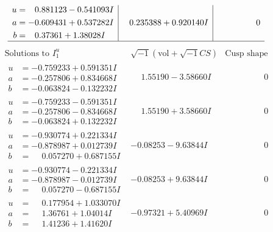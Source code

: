 \documentclass[1p]{elsarticle_modified}
\theoremstyle{definition}
\newcommand{\I}{\sqrt{-1}}
\begin{document}
$$\begin{array}{c|c|c}
\begin{aligned}
u &= \phantom{-}0.881123 - 0.541093 I \\
a &= -0.609431 + 0.537282 I \\
b &= \phantom{-}0.37361 + 1.38028 I\end{aligned}
 & \phantom{-}0.235388 + 0.920140 I & \phantom{-0.000000 } 0\\
 \hline 
 \end{array}$$\newpage$$\begin{array}{c|c|c}  
\text{Solutions to }I^u_{1}& \I (\text{vol} + \sqrt{-1}CS) & \text{Cusp shape}\\
 \hline 
\begin{aligned}
u &= -0.759233 + 0.591351 I \\
a &= -0.257806 + 0.834668 I \\
b &= -0.063824 - 0.132232 I\end{aligned}
 & \phantom{-}1.55190 - 3.58660 I & \phantom{-0.000000 } 0 \\ \hline\begin{aligned}
u &= -0.759233 - 0.591351 I \\
a &= -0.257806 - 0.834668 I \\
b &= -0.063824 + 0.132232 I\end{aligned}
 & \phantom{-}1.55190 + 3.58660 I & \phantom{-0.000000 } 0 \\ \hline\begin{aligned}
u &= -0.930774 + 0.221334 I \\
a &= -0.878987 + 0.012739 I \\
b &= \phantom{-}0.057270 + 0.687155 I\end{aligned}
 & -0.08253 - 9.63844 I & \phantom{-0.000000 } 0 \\ \hline\begin{aligned}
u &= -0.930774 - 0.221334 I \\
a &= -0.878987 - 0.012739 I \\
b &= \phantom{-}0.057270 - 0.687155 I\end{aligned}
 & -0.08253 + 9.63844 I & \phantom{-0.000000 } 0 \\ \hline\begin{aligned}
u &= \phantom{-}0.177954 + 1.033070 I \\
a &= \phantom{-}1.36761 + 1.04014 I \\
b &= \phantom{-}1.41236 + 1.41620 I\end{aligned}
 & -0.97321 + 5.40969 I & \phantom{-0.000000 } 0 \\ \hline\begin{aligned}

\end{aligned}
\end{array}$$
\end{document}

